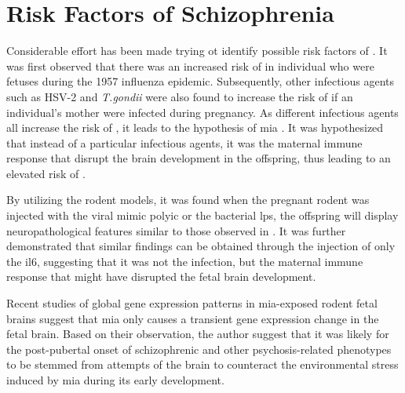\documentclass[12pt]{book}
\newcommand*{\glng}{\glsentrylong}
\begin{document}
	\section{Risk Factors of Schizophrenia}
	Considerable effort has been made trying ot identify possible risk factors of \glng{scz}. 
	It was first observed that there was an increased risk of \glng{scz} in individual who were fetuses during the 1957 influenza epidemic\citep{Mednick1958}. 
	Subsequently, other infectious agents such as HSV-2 and \textit{T.gondii} were also found to increase the risk of \glng{scz} if an individual's mother were infected during pregnancy.
	As different infectious agents all increase the risk of \glng{scz}, it leads to the hypothesis of \gls{mia} \citep{Brown2010}.
	It was hypothesized that instead of a particular infectious agents, it was the maternal immune response that disrupt the brain development in the offspring, thus leading to an elevated risk of \glng{scz}.
		
	By utilizing the rodent models, it was found when the pregnant rodent was injected with the viral mimic \gls{polyic} or the bacterial \gls{lps}, the offspring will display neuropathological features similar to those observed in \glng{scz}\citep{Meyer2009b}.
	It was further demonstrated that similar findings can be obtained through the injection of only the \gls{il6}, suggesting that it was not the infection, but the maternal immune response that might have disrupted the fetal brain development.
	
	Recent studies of global gene expression patterns in \gls{mia}-exposed rodent fetal brains \citep{Garbett2012a} suggest that \gls{mia} only causes a transient gene expression change in the fetal brain.
	Based on their observation, the author suggest that it was likely for the post-pubertal onset of schizophrenic and other psychosis-related phenotypes to be stemmed from attempts of the brain to counteract the environmental stress induced by \gls{mia} during its early development\citep{Garbett2012a}. 
	
\end{document}
